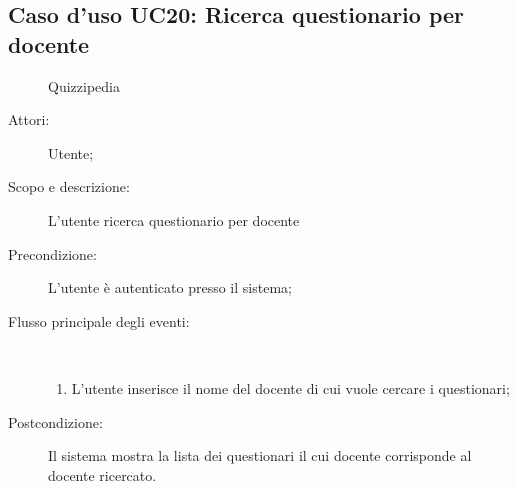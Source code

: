 \subsection{Caso d'uso UC20: Ricerca questionario per docente}
	\begin{figure}[H]
		\centering
		\begin{resizedtikzpicture}{\textwidth}
		\begin{umlsystem}[x=0, fill=lightgray!20]{Quizzipedia}
		\end{umlsystem}
		\end{resizedtikzpicture}
		\caption{}
	\end{figure}
\begin{description}
\item[Attori:] Utente;
\item[Scopo e descrizione:] L'utente ricerca questionario per docente
      \item[Precondizione:] L'utente è autenticato presso il sistema;

        \item[Flusso principale degli eventi:] \ 
 \begin{enumerate}
          \item L'utente inserisce il nome del docente di cui vuole cercare i questionari;

      \end{enumerate}
    \item[Postcondizione:] Il sistema mostra la lista dei questionari il cui docente corrisponde al docente ricercato.
  \end{description}
\hypertarget{UC21}{}
